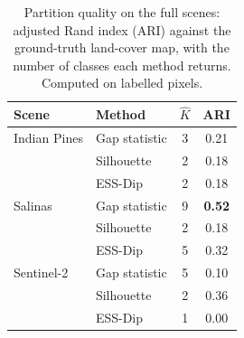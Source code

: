 \begin{table}[t]
\centering
\caption{Partition quality on the full scenes: adjusted Rand index (ARI)
against the ground-truth land-cover map, with the number of classes each method
returns. Computed on labelled pixels.}
\label{tab:realari}
\begin{tabular}{l l c c}
\toprule
Scene & Method & $\hat K$ & ARI\\
\midrule
Indian Pines & Gap statistic & 3 & 0.21\\
             & Silhouette    & 2 & 0.18\\
             & ESS-Dip       & 2 & 0.18\\
\midrule
Salinas      & Gap statistic & 9 & \textbf{0.52}\\
             & Silhouette    & 2 & 0.18\\
             & ESS-Dip       & 5 & 0.32\\
\midrule
Sentinel-2   & Gap statistic & 5 & 0.10\\
             & Silhouette    & 2 & 0.36\\
             & ESS-Dip       & 1 & 0.00\\
\bottomrule
\end{tabular}
\end{table}
